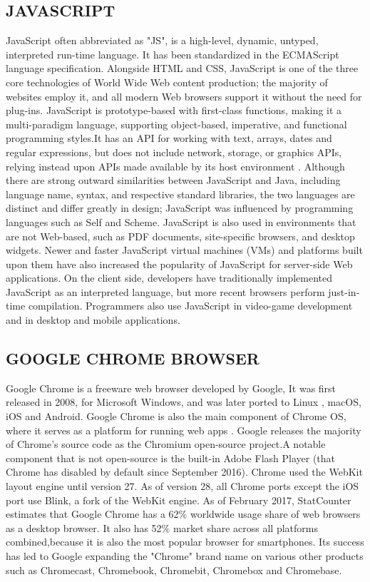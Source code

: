 \documentclass[12pt]{report} %
\begin{document}
\subsection{JAVASCRIPT}
\label{subsec:JAVASCRIPT}
JavaScript \cite{JavascriptTutorialspoint,powell2004javascript}  often abbreviated as "JS", is a high-level, dynamic, untyped, interpreted run-time language. It has been standardized in the ECMAScript language specification. Alongside HTML\cite{htmlW3schools} and CSS\cite{cssW3schools}, JavaScript is one of the three core technologies of World Wide Web content production; the majority of websites employ it, and all modern Web browsers support it without the need for plug-ins\cite{Ahmed:2014:WDP:2675602}. JavaScript is prototype-based with first-class functions, making it a multi-paradigm language, supporting object-based, imperative, and functional programming styles.It has an API for working with text, arrays, dates and regular expressions, but does not include network, storage, or graphics APIs, relying instead upon APIs made available by its host environment\cite{js_validation_apiW3schools} .
Although there are strong outward similarities between JavaScript and Java, including language name, syntax, and respective standard libraries, the two languages are distinct and differ greatly in design; JavaScript was influenced by programming languages such as Self and Scheme.
JavaScript is also used in environments that are not Web-based, such as PDF documents, site-specific browsers, and desktop widgets. Newer and faster JavaScript virtual machines (VMs) and platforms built upon them have also increased the popularity of JavaScript for server-side Web applications. On the client side, developers have traditionally implemented JavaScript as an interpreted language, but more recent browsers perform just-in-time compilation. Programmers also use JavaScript in video-game development and in desktop and mobile applications.

\subsection{GOOGLE CHROME BROWSER}
\label{subsec:GOOGLE CHROME BROWSER}
Google Chrome is a freeware web browser developed by Google, It was first released in 2008, for Microsoft Windows, and was later ported to Linux\cite{Siever:2005:LN:1212560} , macOS, iOS and Android. Google Chrome is also the main component of Chrome OS, where it serves as a platform for running web apps \cite{chromeExtension}.
Google releases the majority of Chrome's source code as the Chromium open-source project.A notable component that is not open-source is the built-in Adobe Flash Player (that Chrome has disabled by default since September 2016). Chrome used the WebKit layout engine until version 27. As of version 28, all Chrome ports except the iOS port use Blink, a fork of the WebKit engine.
As of February 2017, StatCounter estimates that Google Chrome has a 62\% worldwide usage share of web browsers as a desktop browser. It also has 52\% market share across all platforms combined,because it is also the most popular browser for smartphones. Its success has led to Google expanding the "Chrome" brand name on various other products such as Chromecast, Chromebook, Chromebit, Chromebox and Chromebase.
\end{document}
